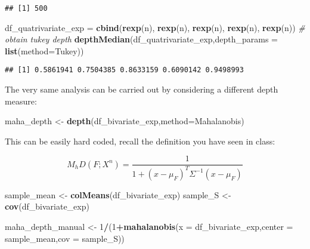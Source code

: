 \documentclass[
]{article}
\newenvironment{Shaded}{\begin{snugshade}}{\end{snugshade}}
\newcommand{\AttributeTok}[1]{\textcolor[rgb]{0.13,0.29,0.53}{#1}}
\newcommand{\CommentTok}[1]{\textcolor[rgb]{0.56,0.35,0.01}{\textit{#1}}}
\newcommand{\DecValTok}[1]{\textcolor[rgb]{0.00,0.00,0.81}{#1}}
\newcommand{\FunctionTok}[1]{\textcolor[rgb]{0.13,0.29,0.53}{\textbf{#1}}}
\newcommand{\NormalTok}[1]{#1}
\newcommand{\OtherTok}[1]{\textcolor[rgb]{0.56,0.35,0.01}{#1}}
\newcommand{\SpecialCharTok}[1]{\textcolor[rgb]{0.81,0.36,0.00}{\textbf{#1}}}
\newcommand{\StringTok}[1]{\textcolor[rgb]{0.31,0.60,0.02}{#1}}
\begin{document}
\begin{verbatim}
## [1] 500
\end{verbatim}

\begin{Shaded}
\begin{Highlighting}[]
\NormalTok{df\_quatrivariate\_exp }\OtherTok{=} \FunctionTok{cbind}\NormalTok{(}\FunctionTok{rexp}\NormalTok{(n), }\FunctionTok{rexp}\NormalTok{(n), }\FunctionTok{rexp}\NormalTok{(n), }\FunctionTok{rexp}\NormalTok{(n), }\FunctionTok{rexp}\NormalTok{(n))}
\CommentTok{\# obtain tukey depth}
\FunctionTok{depthMedian}\NormalTok{(df\_quatrivariate\_exp,}\AttributeTok{depth\_params =} \FunctionTok{list}\NormalTok{(}\AttributeTok{method=}\StringTok{\textquotesingle{}Tukey\textquotesingle{}}\NormalTok{))}
\end{Highlighting}
\end{Shaded}

\begin{verbatim}
## [1] 0.5861941 0.7504385 0.8633159 0.6090142 0.9498993
\end{verbatim}

The very same analysis can be carried out by considering a different
depth measure:

\begin{Shaded}
\begin{Highlighting}[]
\NormalTok{maha\_depth }\OtherTok{\textless{}{-}} \FunctionTok{depth}\NormalTok{(df\_bivariate\_exp,}\AttributeTok{method=}\StringTok{\textquotesingle{}Mahalanobis\textquotesingle{}}\NormalTok{) }
\end{Highlighting}
\end{Shaded}

This can be easily hard coded, recall the definition you have seen in
class:

\[{M}_{h}D({F;X} ^ {n}) = \frac{ 1 }{ 1 + {{(x - \mu_F)} ^ {T}}{{\Sigma} ^ {-1}}(x - \mu_F) }\]

\begin{Shaded}
\begin{Highlighting}[]
\NormalTok{sample\_mean }\OtherTok{\textless{}{-}} \FunctionTok{colMeans}\NormalTok{(df\_bivariate\_exp)}
\NormalTok{sample\_S }\OtherTok{\textless{}{-}} \FunctionTok{cov}\NormalTok{(df\_bivariate\_exp)}

\NormalTok{maha\_depth\_manual }\OtherTok{\textless{}{-}} \DecValTok{1}\SpecialCharTok{/}\NormalTok{(}\DecValTok{1}\SpecialCharTok{+}\FunctionTok{mahalanobis}\NormalTok{(}\AttributeTok{x =}\NormalTok{ df\_bivariate\_exp,}\AttributeTok{center =}\NormalTok{ sample\_mean,}\AttributeTok{cov =}\NormalTok{ sample\_S))}
\end{Highlighting}
\end{Shaded}
\end{document}

